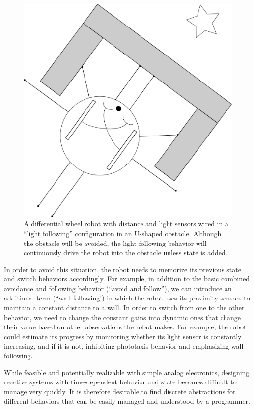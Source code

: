 \begin{figure}
\centering
\includegraphics[width=0.8\columnwidth]{figs/uobstacle.png}
\caption{\label{fig:uobstacle}A differential wheel robot with distance and light sensors wired in a ``light following'' configuration in an U-shaped obstacle. Although the obstacle will be avoided, the light following behavior will continuously drive the robot into the obstacle unless state is added.}
\end{figure}


In order to avoid this situation, the robot needs to memorize its previous state and switch behaviors accordingly. For example, in addition to the basic combined avoidance and following behavior (``avoid and follow''), we can introduce an additional term (``wall following') in which the robot uses its proximity sensors to maintain a constant distance to a wall. In order to switch from one to the other behavior, we need to change the constant gains into dynamic ones that change their value based on other observations the robot makes. For example, the robot could estimate its progress by monitoring whether its light sensor is constantly increasing, and if it is not, inhibiting phototaxis behavior and emphasizing wall following. 

While feasible and potentially realizable with simple analog electronics, designing reactive systems with time-dependent behavior and state becomes difficult to manage very quickly. It is therefore desirable to find discrete abstractions for different behaviors that can be easily managed and understood by a programmer.  
%
%
